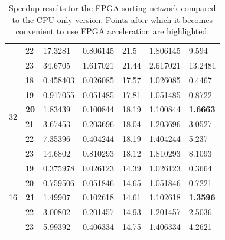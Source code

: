 \begin{table}
\begin{tabularx}{\textwidth}{X|X|X|X|X|X|X}
    & 22          & 17.3281  & 0.806145  & 21.5            & 1.806145        & 9.594              \\
    & 23          & 34.6705  & 1.617021  & 21.44           & 2.617021        & 13.2481            \\
    \hline
    \multirow{6}{*}{32}     & 18          & 0.458403 & 0.026085  & 17.57           & 1.026085        & 0.4467             \\
    & 19          & 0.917055 & 0.051485  & 17.81           & 1.051485        & 0.8722             \\
    & \textbf{20} & 1.83439  & 0.100844  & 18.19           & 1.100844        & \textbf{1.6663}    \\
    & 21          & 3.67453  & 0.203696  & 18.04           & 1.203696        & 3.0527             \\
    & 22          & 7.35396  & 0.404244  & 18.19           & 1.404244        & 5.237              \\
    & 23          & 14.6802  & 0.810293  & 18.12           & 1.810293        & 8.1093             \\
    \hline
    \multirow{5}{*}{16}  & 19          & 0.375978 & 0.026123  & 14.39           & 1.026123        & 0.3664             \\
    & 20          & 0.759506 & 0.051846  & 14.65           & 1.051846        & 0.7221             \\
    & \textbf{21} & 1.49907  & 0.102618  & 14.61           & 1.102618        & \textbf{1.3596}    \\
    & 22          & 3.00802  & 0.201457  & 14.93           & 1.201457        & 2.5036             \\
    & 23          & 5.99392  & 0.406334  & 14.75           & 1.406334        & 4.2621             \\
  \end{tabularx}
  \caption{Speedup results for the FPGA sorting network compared to
    the CPU only version. Points after which it becomes convenient to
    use FPGA acceleration are highlighted.}
\end{table}


